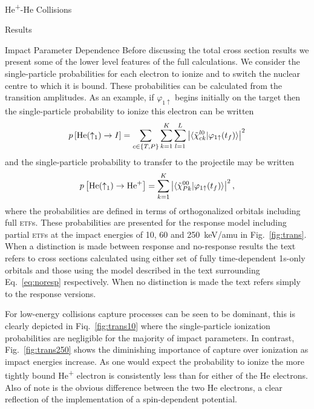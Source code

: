 \documentclass[a5paper, 9 pt]{extreport}
\begin{document}
\begin{chapter}{\texorpdfstring{He\textsuperscript{+}}{He+}-He Collisions \label{chap:hephe}}
\begin{section}{Results \label{sec:hephe-disc}}
\begin{subsection}{Impact Parameter Dependence \label{sec:hephepb}}
         Before discussing the total cross section results we present some of the lower level features
         of the full calculations. We consider the single-particle probabilities for each electron to
         ionize and to switch the nuclear centre to which it is bound. These probabilities can be
         calculated from the transition amplitudes. As an example, if $\varphi_{1 \uparrow}$ begins
         initially on the target then the single-particle probability to ionize this electron can be
         written
         \begin{equation} \label{eq:ionprob}
            p \left[ \mathrm{He}(\uparrow_1) \rightarrow I \right] =
               \sum\limits_{c \in \{T,P\}} \sum\limits_{k=1}^K \sum\limits_{l = 1}^L
               \left| \braket{ \tilde{\chi}^{l0}_{c k} | \varphi_{1 \uparrow}(t_f)} \right|^2
         \end{equation}
         and the single-particle probability to transfer to the projectile may be written
         \begin{equation} \label{eq:transprob}
            p \left[ \mathrm{He}(\uparrow_1) \rightarrow \mathrm{He}^+ \right] =
               \sum\limits_{k=1}^K \left| \braket{ \tilde{\chi}^{00}_{P k} | \varphi_{1 \uparrow}(t_f)}
                          \right|^2,
         \end{equation}
         where the probabilities are defined in terms of orthogonalized orbitals including full
         \textsc{etf}s. These probabilities are presented for the response model including partial
         \textsc{etf}s at the impact energies of 10, 60 and 250~keV/amu in Fig.~\ref{fig:trans}. When a
         distinction is made between response and no-response results the text refers to cross sections
         calculated using either set of fully time-dependent 1s-only orbitals and those using the model
         described in the text surrounding Eq.~\eqref{eq:noresp} respectively. When no distinction is
         made the text refers simply to the response versions.

         For low-energy collisions capture processes can be seen to be dominant, this is clearly
         depicted in Fiq.~\ref{fig:trans10} where the single-particle ionization probabilities are
         negligible for the majority of impact parameters. In contrast, Fig.~\ref{fig:trans250}
         shows the diminishing importance of capture over ionization as impact energies increase.
         As one would expect the probability to ionize the more tightly bound He\textsuperscript{+}
         electron is consistently less than for either of the He electrons. Also of note is the obvious
         difference between the two He electrons, a clear reflection of the implementation of a
         spin-dependent potential.


\end{subsection}
\end{section}
\end{chapter}
\end{document}
